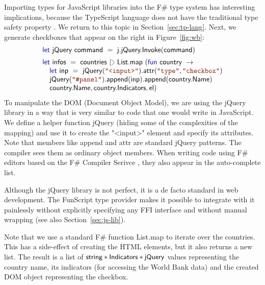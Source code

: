 \documentclass[submission,copyright,creativecommons]{eptcs}
\newcommand{\rang}{\begin{picture}(5,7)
\put(.1,2.5){\rotatebox{135}{\line(1,0){6.0}}}
\put(.1,2.5){\rotatebox{225}{\line(1,0){6.0}}}
\end{picture}}
\newcommand{\kvd}[1]{\textnormal{\textcolor{kvdclr}{\sffamily #1}}}
\newcommand{\str}[1]{\textnormal{\textcolor{strclr}{\ttfamily "#1"}}}
\newcommand{\ident}[1]{\textnormal{\sffamily #1}}
\begin{document}
Importing types for JavaScript libraries into the F\# type system has interesting implications, 
because the TypeScript language does not have the traditional type safety property \cite{ms-safets}.
We return to this topic in Section~\ref{sec:tp-lang}. Next, we generate checkboxes that appear on the 
right in Figure~\ref{fig:wb}:
%
\begin{equation*}
\begin{array}{lll}
 \kvd{let}~\ident{jQuery}~\ident{command}~=~\ident{j.jQuery.Invoke}(\ident{command}) 
 \\[0.5em]
 \kvd{let}~\ident{infos}~=~\ident{countries}~|\rang~\ident{List.map}~(\kvd{fun}~\ident{country}~\rightarrow \\
 \quad \kvd{let}~\ident{inp}~=~\ident{jQuery}(\str{<input>})\ident{.attr}(\str{type}, \str{checkbox}) \\
 \quad \ident{jQuery}(\str{\#panel})\ident{.append}(\ident{inp})\ident{.append}(\ident{country.Name}) \\
 \quad \ident{country.Name}, \ident{country.Indicators}, \ident{el}) \\
\end{array}
\end{equation*}
%
To manipulate the DOM (Document Object Model), we are using the jQuery library in a way that is
very similar to code that one would write in JavaScript. We define a helper function \ident{jQuery}
(hiding some of the complexities of the mapping) and use it to create the \str{<input>} element and
specify its attributes. Note that members like \ident{append} and \ident{attr} are standard 
jQuery patterns. The compiler sees them as ordinary object members. When writing code using F\# editors
based on the F\# Compiler Serivce \cite{fsharp-fcs}, they also appear in the auto-complete list.

Although the jQuery library is not perfect, it is a de facto standard in web development. The 
FunScript type provider makes it possible to integrate with it painlessly without explicitly 
specifying any FFI interface and without manual wrapping (see also Section~\ref{sec:js-lib}). 

Note that we use a standard F\# function \ident{List.map} to iterate over the countries. This has 
a side-effect of creating the HTML elements, but it also returns a new list. The result is a list 
of $\ident{string}\ast\ident{Indicators}\ast\ident{jQuery}$ values representing the country name,
its indicators (for accessing the World Bank data) and the created DOM object representing the
checkbox.
\end{document}

